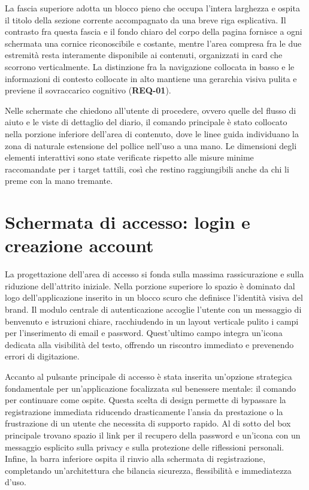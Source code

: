 La fascia superiore adotta un blocco pieno che occupa l'intera larghezza e ospita il titolo della sezione corrente accompagnato da una breve riga esplicativa.
Il contrasto fra questa fascia e il fondo chiaro del corpo della pagina fornisce a ogni schermata una cornice riconoscibile e costante, mentre l'area compresa fra le due estremità resta interamente disponibile ai contenuti, organizzati in card che scorrono verticalmente.
La distinzione fra la navigazione collocata in basso e le informazioni di contesto collocate in alto mantiene una gerarchia visiva pulita e previene il sovraccarico cognitivo (\textbf{REQ-01}).

Nelle schermate che chiedono all'utente di procedere, ovvero quelle del flusso di aiuto e le viste di dettaglio del diario, il comando principale è stato collocato nella porzione inferiore dell'area di contenuto, dove le linee guida individuano la zona di naturale estensione del pollice nell'uso a una mano.
Le dimensioni degli elementi interattivi sono state verificate rispetto alle misure minime raccomandate per i target tattili, così che restino raggiungibili anche da chi li preme con la mano tremante.

\section{Schermata di accesso: login e creazione account}
\label{sec:wireframe-accesso}

La progettazione dell'area di accesso si fonda sulla massima rassicurazione e sulla riduzione dell'attrito iniziale.
Nella porzione superiore lo spazio è dominato dal logo dell'applicazione inserito in un blocco scuro che definisce l'identità visiva del brand.
Il modulo centrale di autenticazione accoglie l'utente con un messaggio di benvenuto e istruzioni chiare, racchiudendo in un layout verticale pulito i campi per l'inserimento di email e password.
Quest'ultimo campo integra un'icona dedicata alla visibilità del testo, offrendo un riscontro immediato e prevenendo errori di digitazione.

Accanto al pulsante principale di accesso è stata inserita un'opzione strategica fondamentale per un'applicazione focalizzata sul benessere mentale: il comando per continuare come ospite.
Questa scelta di design permette di bypassare la registrazione immediata riducendo drasticamente l'ansia da prestazione o la frustrazione di un utente che necessita di supporto rapido.
Al di sotto del box principale trovano spazio il link per il recupero della password e un'icona con un messaggio esplicito sulla privacy e sulla protezione delle riflessioni personali.
Infine, la barra inferiore ospita il rinvio alla schermata di registrazione, completando un'architettura che bilancia sicurezza, flessibilità e immediatezza d'uso.

